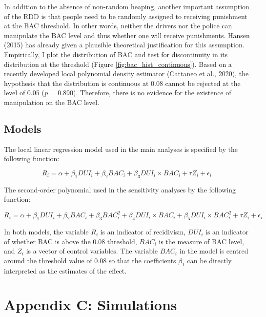 \documentclass[
  11pt,
]{article}
\begin{document}
In addition to the absence of non-random heaping, another important
assumption of the RDD is that people need to be randomly assigned to
receiving punishment at the BAC threshold. In other words, neither the
drivers nor the police can manipulate the BAC level and thus whether one
will receive punishments. Hansen (2015) has already given a plausible
theoretical justification for this assumption. Empirically, I plot the
distribution of BAC and test for discontinuity in its distribution at
the threshold (Figure \ref{fig:bac_hist_continuous}). Based on a
recently developed local polynomial density estimator (Cattaneo et al.,
2020), the hypothesis that the distribution is continuous at 0.08 cannot
be rejected at the level of 0.05 (\textit{p} = 0.890). Therefore, there
is no evidence for the existence of manipulation on the BAC level.

\hypertarget{models}{%
\subsection*{Models}\label{models}}

The local linear regression model used in the main analyses is specified
by the following function:

\begin{equation}
  \label{eqn:model}
  R_i = \alpha + \beta_1 DUI_i + \beta_2 BAC_i + \beta_3 DUI_i \times BAC_i + \tau Z_i + \epsilon_i
\end{equation}

The second-order polynomial used in the sensitivity analyses by the
following function:

\begin{equation}
  R_i = \alpha + \beta_1 DUI_i + \beta_2 BAC_i + \beta_3 BAC_i^2 + \beta_4 DUI_i \times BAC_i + \beta_5 DUI_i \times BAC_i^2 + \tau Z_i + \epsilon_i
\end{equation}

In both models, the variable \(R_i\) is an indicator of recidivism,
\(DUI_i\) is an indicator of whether BAC is above the 0.08 threshold,
\(BAC_i\) is the measure of BAC level, and \(Z_i\) is a vector of
control variables. The variable \(BAC_i\) in the model is centred around
the threshold value of 0.08 so that the coefficients \(\beta_1\) can be
directly interpreted as the estimates of the effect.

\newpage

\hypertarget{appendix-c-simulations}{%
\section*{Appendix C: Simulations}\label{appendix-c-simulations}}
\end{document}
